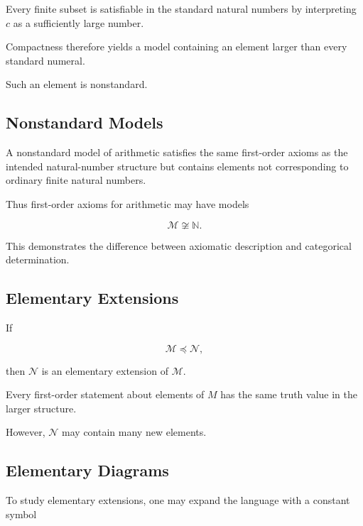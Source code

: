 Every finite subset is satisfiable in the standard natural numbers by
interpreting \(c\) as a sufficiently large number.

Compactness therefore yields a model containing an element larger than
every standard numeral.

Such an element is nonstandard.

\subsection{Nonstandard Models}
\label{subsec:nonstandard-models}

A nonstandard model of arithmetic satisfies the same first-order axioms as
the intended natural-number structure but contains elements not
corresponding to ordinary finite natural numbers.

Thus first-order axioms for arithmetic may have models

\[
\boxed{
\mathcal{M}
\not\cong
\mathbb{N}.
}
\]

This demonstrates the difference between axiomatic description and
categorical determination.

\subsection{Elementary Extensions}
\label{subsec:elementary-extensions}

If

\[
\mathcal{M}
\preccurlyeq
\mathcal{N},
\]

then \(\mathcal{N}\) is an elementary extension of \(\mathcal{M}\).

Every first-order statement about elements of \(M\) has the same truth
value in the larger structure.

However, \(\mathcal{N}\) may contain many new elements.

\subsection{Elementary Diagrams}
\label{subsec:elementary-diagrams}

To study elementary extensions, one may expand the language with a constant
symbol


